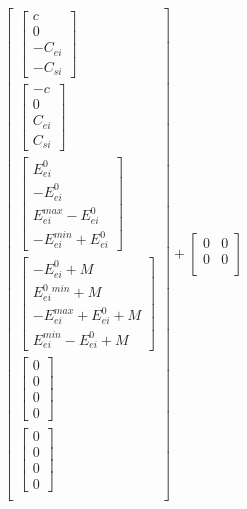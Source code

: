 \documentclass[11pt]{article} %
\begin{document}
\begin{align}
    \begin{bmatrix}
        \begin{bmatrix}
            c \\
             0 \\
            -C_{ei} \\
            -C_{si}
        \end{bmatrix} \\
        \begin{bmatrix}
            -c \\
             0 \\
            C_{ei} \\
            C_{si}
        \end{bmatrix}\\
        \begin{bmatrix}
            E_{ei}^{0}\\
            -E_{ei}^{0}\\
            E_{ei}^{max} - E_{ei}^{0}\\
            -E_{ei}^{min} + E_{ei}^{0}
        \end{bmatrix}\\
        \begin{bmatrix}
            -E_{ei}^{0} + M\\
            E_{ei}^{0}^{min} + M\\
            -E_{ei}^{max} + E_{ei}^{0} + M\\
            E_{ei}^{min} - E_{ei}^{0} + M
        \end{bmatrix}\\
        \begin{bmatrix}
            0\\
            0\\
            0\\
            0
        \end{bmatrix}\\
        \begin{bmatrix}
            0\\
            0\\
            0\\
            0
        \end{bmatrix}\\
    \end{bmatrix}  +
    \begin{bmatrix}
        0 & 0\\
        0 & 0\\

\end{bmatrix}
\end{align}
\end{document}
